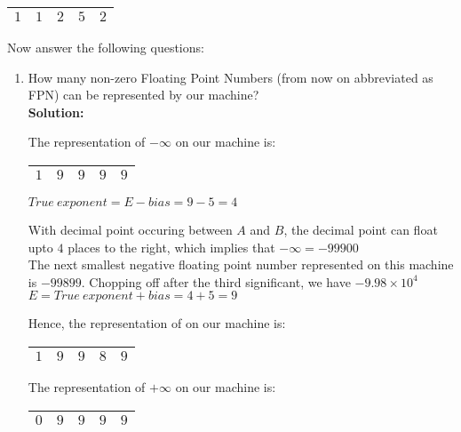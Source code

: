 \documentclass{article}
\begin{document}
\begin{enumerate}
\begin{center}
\renewcommand{\arraystretch}{1.7}
\begin{tabular}{|c|c|c|c|c|}
\hline
$1$ & $1$ & $2$ & $5$ & $2$ \\
\hline
\end{tabular}
\end{center}

Now answer the following questions:
\begin{enumerate}
\item How many non-zero Floating Point Numbers (from now on abbreviated as FPN) can be
represented by our machine? \\

\textbf{Solution:}

The representation of $-\infty$ on our machine is:

\begin{center}
\renewcommand{\arraystretch}{1.7}
\begin{tabular}{|c|c|c|c|c|}
\hline
$1$ & $9$ & $9$ & $9$ & $9$ \\
\hline
\end{tabular}
\end{center}

$True \ exponent = E - bias = 9 - 5 = 4$

With decimal point occuring between $A$ and $B$, the decimal point can float upto $4$
places to the right, which implies that $-\infty = -99900$ \\

The next smallest negative floating point number represented on this machine is $-99899$.
Chopping off after the third significant, we have $-9.98 \times 10^{4}$ \\

$E = True \ exponent + bias = 4 + 5 = 9$

Hence, the representation of on our machine is: 

\begin{center}
\renewcommand{\arraystretch}{1.7}
\begin{tabular}{|c|c|c|c|c|}
\hline
$1$ & $9$ & $9$ & $8$ & $9$ \\
\hline
\end{tabular}
\end{center}


The representation of $+\infty$ on our machine is:

\begin{center}
\renewcommand{\arraystretch}{1.7}
\begin{tabular}{|c|c|c|c|c|}
\hline
$0$ & $9$ & $9$ & $9$ & $9$ \\
\hline
\end{tabular}
\end{center}


\end{enumerate}
\end{enumerate}
\end{document}
